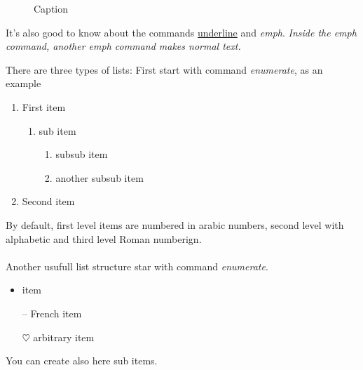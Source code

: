 \documentclass[12pt, titlepage, a4paper]{article}  %
\begin{document}
\begin{figure}[h!]    %
\vspace{-10 pt}
\begin{center} 
\end{center} 
\caption{Caption}
\vspace{10 pt}
\end{figure}

It's also good to know about the commands \underline{underline} and \emph{emph}. \emph{Inside the emph command, another emph command makes \emph{normal} text.}


\newpage
There are three types of lists: 
First start with command {\it enumerate}, as an example 

\begin{enumerate}
\item First item
    \begin{enumerate}    %
    \item sub item
        \begin{enumerate} 
        \item subsub item
        \item another subsub item
        \end{enumerate}
    \end{enumerate}
\item Second item
\end{enumerate}
By default, first level items are numbered in arabic numbers, second level with alphabetic and third level Roman numberign.\\\\
Another usufull list structure star with command {\it enumerate}.

\begin{itemize}
\item item
\item[--] French item
\item[$\heartsuit$] arbitrary item    %
\end{itemize}
You can create also here sub items.
\end{document}
